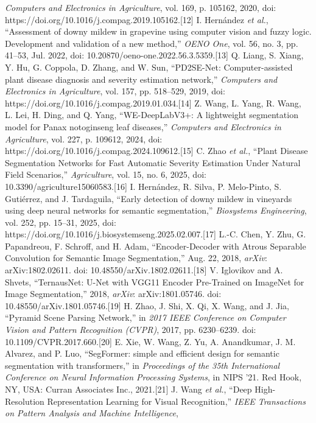 \documentclass[
]{article}
\begin{document}
\emph{Computers and Electronics in Agriculture}, vol. 169, p. 105162,
2020, doi: https://doi.org/10.1016/j.compag.2019.105162.{[}12{]} I.
Hernández \emph{et al.}, ``Assessment of downy mildew in grapevine using
computer vision and fuzzy logic. Development and validation of a new
method,'' \emph{OENO One}, vol. 56, no. 3, pp. 41--53, Jul. 2022, doi:
10.20870/oeno-one.2022.56.3.5359.{[}13{]} Q. Liang, S. Xiang, Y. Hu, G.
Coppola, D. Zhang, and W. Sun, ``PD2SE-Net: Computer-assisted plant
disease diagnosis and severity estimation network,'' \emph{Computers and
Electronics in Agriculture}, vol. 157, pp. 518--529, 2019, doi:
https://doi.org/10.1016/j.compag.2019.01.034.{[}14{]} Z. Wang, L. Yang,
R. Wang, L. Lei, H. Ding, and Q. Yang, ``WE-DeepLabV3+: A lightweight
segmentation model for Panax notoginseng leaf diseases,''
\emph{Computers and Electronics in Agriculture}, vol. 227, p. 109612,
2024, doi: https://doi.org/10.1016/j.compag.2024.109612.{[}15{]} C. Zhao
\emph{et al.}, ``Plant Disease Segmentation Networks for Fast Automatic
Severity Estimation Under Natural Field Scenarios,'' \emph{Agriculture},
vol. 15, no. 6, 2025, doi: 10.3390/agriculture15060583.{[}16{]} I.
Hernández, R. Silva, P. Melo-Pinto, S. Gutiérrez, and J. Tardaguila,
``Early detection of downy mildew in vineyards using deep neural
networks for semantic segmentation,'' \emph{Biosystems Engineering},
vol. 252, pp. 15--31, 2025, doi:
https://doi.org/10.1016/j.biosystemseng.2025.02.007.{[}17{]} L.-C. Chen,
Y. Zhu, G. Papandreou, F. Schroff, and H. Adam, ``Encoder-Decoder with
Atrous Separable Convolution for Semantic Image Segmentation,'' Aug. 22,
2018, \emph{arXiv}: arXiv:1802.02611. doi:
10.48550/arXiv.1802.02611.{[}18{]} V. Iglovikov and A. Shvets,
``TernausNet: U-Net with VGG11 Encoder Pre-Trained on ImageNet for Image
Segmentation,'' 2018, \emph{arXiv}: arXiv:1801.05746. doi:
10.48550/arXiv.1801.05746.{[}19{]} H. Zhao, J. Shi, X. Qi, X. Wang, and
J. Jia, ``Pyramid Scene Parsing Network,'' in \emph{2017 IEEE Conference
on Computer Vision and Pattern Recognition (CVPR)}, 2017, pp.
6230--6239. doi: 10.1109/CVPR.2017.660.{[}20{]} E. Xie, W. Wang, Z. Yu,
A. Anandkumar, J. M. Alvarez, and P. Luo, ``SegFormer: simple and
efficient design for semantic segmentation with transformers,'' in
\emph{Proceedings of the 35th International Conference on Neural
Information Processing Systems}, in NIPS '21. Red Hook, NY, USA: Curran
Associates Inc., 2021.{[}21{]} J. Wang \emph{et al.}, ``Deep
High-Resolution Representation Learning for Visual Recognition,''
\emph{IEEE Transactions on Pattern Analysis and Machine Intelligence},
\end{document}
